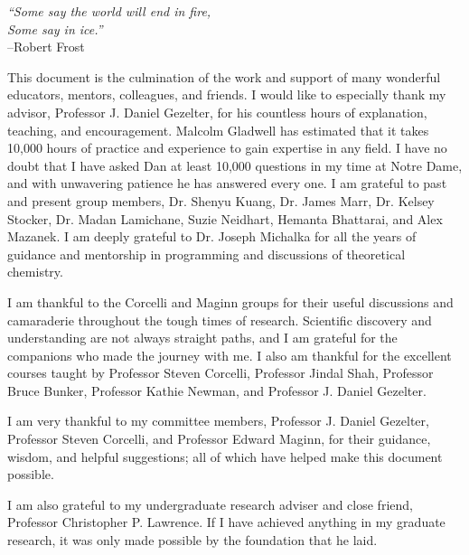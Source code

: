 \documentclass[noinfo,final,sort&compress]{nddiss2e}
\begin{document}

\tableofcontents
\listoffigures
\listoftables

\begin{preface}
\vfill
\begin{flushright}
\textit{``Some say the world will end in fire,} \\
\textit{Some say in ice.''}\\
--Robert Frost
\end{flushright}
\vfill
\end{preface}

\begin{acknowledge}
  This document is the culmination of the work and support of many
  wonderful educators, mentors, colleagues, and friends. I would like
  to especially thank my advisor, Professor J. Daniel Gezelter, for
  his countless hours of explanation, teaching, and
  encouragement. Malcolm Gladwell has estimated that it takes 10,000
  hours of practice and experience to gain expertise in any field. I
  have no doubt that I have asked Dan at least 10,000 questions in my
  time at Notre Dame, and with unwavering patience he has answered
  every one. I am grateful to past and present group members,
  Dr. Shenyu Kuang, Dr. James Marr, Dr. Kelsey Stocker, Dr. Madan
  Lamichane, Suzie Neidhart, Hemanta Bhattarai, and Alex Mazanek. I am
  deeply grateful to Dr. Joseph Michalka for all the years of guidance
  and mentorship in programming and discussions of theoretical
  chemistry.

  I am thankful to the Corcelli and Maginn groups for their useful
  discussions and camaraderie throughout the tough times of
  research. Scientific discovery and understanding are not always
  straight paths, and I am grateful for the companions who made the
  journey with me. I also am thankful for the excellent courses taught by
  Professor Steven Corcelli, Professor Jindal Shah, Professor Bruce
  Bunker, Professor Kathie Newman, and Professor J. Daniel Gezelter.

  I am very thankful to my committee members, Professor J. Daniel
  Gezelter, Professor Steven Corcelli, and Professor Edward Maginn,
  for their guidance, wisdom, and helpful suggestions; all of which
  have helped make this document possible.

  I am also grateful to my undergraduate research adviser and close
  friend, Professor Christopher P. Lawrence. If I have achieved
  anything in my graduate research, it was only made possible by the
  foundation that he laid.


\end{acknowledge}
\end{document}
